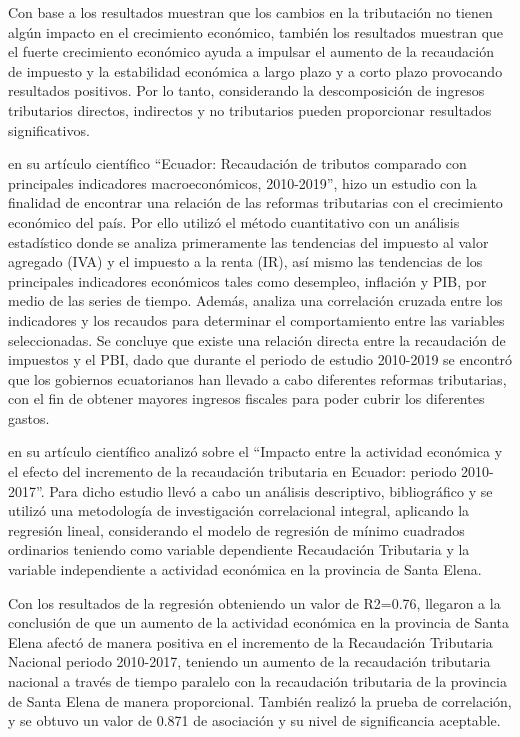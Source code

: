 \documentclass[
  letterpaper,
]{article}
\begin{document}
Con base a los resultados muestran que los cambios en la tributación no
tienen algún impacto en el crecimiento económico, también los resultados
muestran que el fuerte crecimiento económico ayuda a impulsar el aumento
de la recaudación de impuesto y la estabilidad económica a largo plazo y
a corto plazo provocando resultados positivos. Por lo tanto,
considerando la descomposición de ingresos tributarios directos,
indirectos y no tributarios pueden proporcionar resultados
significativos.

\textcite{velepucha_ecuador_2021} en su artículo científico ``Ecuador:
Recaudación de tributos comparado con principales indicadores
macroeconómicos, 2010-2019'', hizo un estudio con la finalidad de
encontrar una relación de las reformas tributarias con el crecimiento
económico del país. Por ello utilizó el método cuantitativo con un
análisis estadístico donde se analiza primeramente las tendencias del
impuesto al valor agregado (IVA) y el impuesto a la renta (IR), así
mismo las tendencias de los principales indicadores económicos tales
como desempleo, inflación y PIB, por medio de las series de tiempo.
Además, analiza una correlación cruzada entre los indicadores y los
recaudos para determinar el comportamiento entre las variables
seleccionadas. Se concluye que existe una relación directa entre la
recaudación de impuestos y el PBI, dado que durante el periodo de
estudio 2010-2019 se encontró que los gobiernos ecuatorianos han llevado
a cabo diferentes reformas tributarias, con el fin de obtener mayores
ingresos fiscales para poder cubrir los diferentes gastos.

\textcite{narvaez_cumbicos_impacto_2019} en su artículo científico
analizó sobre el ``Impacto entre la actividad económica y el efecto del
incremento de la recaudación tributaria en Ecuador: periodo 2010-2017''.
Para dicho estudio llevó a cabo un análisis descriptivo, bibliográfico y
se utilizó una metodología de investigación correlacional integral,
aplicando la regresión lineal, considerando el modelo de regresión de
mínimo cuadrados ordinarios teniendo como variable dependiente
Recaudación Tributaria y la variable independiente a actividad económica
en la provincia de Santa Elena.

Con los resultados de la regresión obteniendo un valor de R2=0.76,
llegaron a la conclusión de que un aumento de la actividad económica en
la provincia de Santa Elena afectó de manera positiva en el incremento
de la Recaudación Tributaria Nacional periodo 2010-2017, teniendo un
aumento de la recaudación tributaria nacional a través de tiempo
paralelo con la recaudación tributaria de la provincia de Santa Elena de
manera proporcional. También realizó la prueba de correlación, y se
obtuvo un valor de 0.871 de asociación y su nivel de significancia
aceptable.
\end{document}

